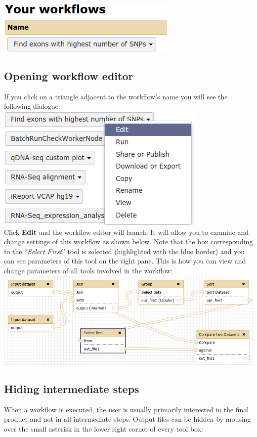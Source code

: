 \documentclass[11pt,a4paper]{article}
\begin{document}
\includegraphics[scale=0.55]{figures/101_26}\\
\subsection{Opening workflow editor}
If you click on a triangle adjacent to the workflow's name you will see the following dialogue:\\

\includegraphics[scale=0.55]{figures/101_27}\\
Click \textbf{Edit} and the workflow editor will launch. It will allow you to examine and change settings of this workflow as shown below. Note that the box corresponding to the ``\textit{Select First}'' tool is selected (highlighted with the blue border) and you can see parameters of this tool on the right pane. This is how you can view and change parameters of all tools involved in the workflow:\\

\includegraphics[width=\textwidth]{figures/101_28}\\
\subsection{Hiding intermediate steps}
When a workflow is executed, the user is usually primarily interested in the final product and not in all intermediate steps. Output files can be hidden by mousing over the small asterisk in the lower right corner of every tool box:\\
\end{document}
